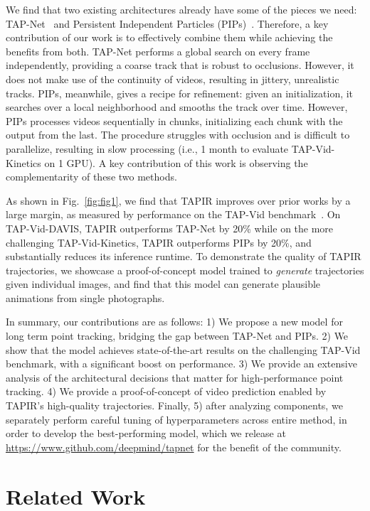 \documentclass[10pt,twocolumn,letterpaper]{article}
\begin{document}
We find that two existing architectures already have some of the pieces we need:  TAP-Net~\cite{doersch2022tap} and Persistent Independent Particles (PIPs)~\cite{harley2022particle}.  Therefore, a key contribution of our work is to effectively combine them while achieving the benefits from both.  TAP-Net  performs a global search on every frame independently, providing a coarse track that is robust to occlusions.  However, it does not make use of the continuity of videos, resulting in jittery, unrealistic tracks.  PIPs, meanwhile, gives a recipe for refinement: given an initialization, it searches over a local neighborhood and smooths the track over time.  However, PIPs processes videos sequentially in chunks, initializing each chunk with the output from the last.  The procedure struggles with occlusion and is difficult to parallelize, resulting in slow processing (i.e., 1 month to evaluate TAP-Vid-Kinetics on 1 GPU).  A key contribution of this work is observing the complementarity of these two methods.  



As shown in Fig.~\ref{fig:fig1}, we find that TAPIR improves over prior works by a large margin, as measured by performance on the TAP-Vid benchmark~\cite{doersch2022tap}.   On TAP-Vid-DAVIS, TAPIR outperforms TAP-Net by 20\% while on the more challenging TAP-Vid-Kinetics, TAPIR outperforms PIPs by 20\%, and substantially reduces its inference runtime.  
To demonstrate the quality of TAPIR trajectories, we showcase a proof-of-concept model trained to \emph{generate} trajectories given individual images, and find that this model can generate plausible animations from single photographs.  

In summary, our contributions are as follows: 1) We propose a new model for long term point tracking, bridging the gap between TAP-Net and PIPs. 2) We show that the model achieves state-of-the-art results on the challenging TAP-Vid benchmark, with a significant boost on performance. 3) We provide an extensive analysis of the architectural decisions that matter for high-performance point tracking. 4) We provide a proof-of-concept of video prediction enabled by TAPIR's high-quality trajectories. Finally, 5) after analyzing components, we separately perform careful tuning of hyperparameters across entire method, in order to develop the best-performing model, which we release at \url{https://www.github.com/deepmind/tapnet} for the benefit of the community.


\section{Related Work}
\end{document}
